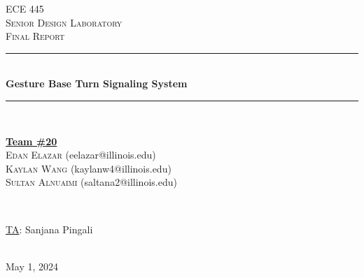 \documentclass[12pt]{article}
\begin{document}
\begin{titlepage}
\newcommand{\HRule}{\rule{\linewidth}{0.1mm}} 
\center %
 
\textsc{\Large ECE 445}\\[0.5cm] %
\textsc{\large Senior Design Laboratory}\\[0.5cm] %
\textsc{\Large Final Report }\\[0.5cm] %

\HRule \\[0.5cm]
\huge \textbf{Gesture Base Turn Signaling System} %
\HRule \\[2cm]
 
\begin{minipage}{0.5\textwidth}
    \begin{center} \large
        \underline{\textbf{Team \#20}} \\ \medskip
        \textsc{Edan Elazar} (eelazar@illinois.edu) \\  
        \textsc{Kaylan Wang} (kaylanw4@illinois.edu)  \\
        \textsc{Sultan Alnuaimi} (saltana2@illinois.edu)
    \end{center}
\end{minipage} \\[1.5cm]

\begin{minipage}{0.5\textwidth}
    \begin{center}
        \large
        \underline{TA}: Sanjana Pingali
    \end{center}
\end{minipage} \\[1cm]

{\large May 1, 2024} %

\vfill %

\end{titlepage}
\setcounter{page}{2}
\clearpage
\tableofcontents
\newpage
\end{document}
